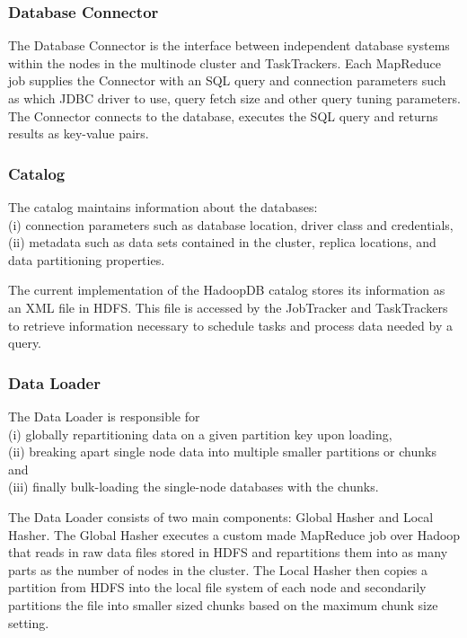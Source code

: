 \documentclass[9pt,twocolumn,twoside]{../../styles/osajnl}
\begin{document}
\subsubsection{Database Connector}
The Database Connector is the interface between independent database systems within the nodes in the multinode cluster and TaskTrackers. Each MapReduce job supplies the Connector with an SQL query and connection parameters such as which JDBC driver to use, query fetch size and other query tuning parameters. The Connector connects to the database, executes the SQL query and returns results as key-value pairs.

\subsubsection{Catalog}
The catalog maintains information about the databases:
\\(i) connection parameters such as database
location, driver class and credentials, 
\\(ii) metadata such as data sets contained in the cluster, replica locations, and data partitioning properties.

The current implementation of the HadoopDB catalog stores its information as an XML file in HDFS. This file is accessed by the JobTracker and TaskTrackers to retrieve information necessary
to schedule tasks and process data needed by a query.

\subsubsection{Data Loader}
The Data Loader is responsible for 
\\(i) globally repartitioning data on a given partition key upon loading, 
\\(ii) breaking apart single node data into multiple smaller partitions or chunks and 
\\(iii) finally bulk-loading the single-node databases with the chunks.

The Data Loader consists of two main components: Global Hasher and Local Hasher. The Global Hasher executes a custom made MapReduce job over Hadoop that reads in raw data files stored in HDFS and repartitions them into as many parts as the
number of nodes in the cluster. The Local Hasher then copies a partition from HDFS into the
local file system of each node and secondarily partitions the file into smaller sized chunks based on the maximum chunk size setting.
\end{document}
